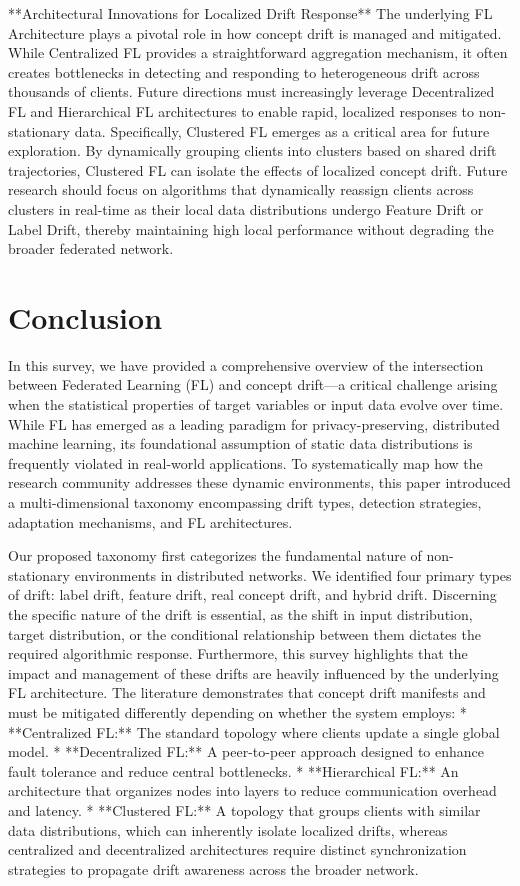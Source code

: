 \documentclass[journal]{IEEEtran}
\begin{document}
**Architectural Innovations for Localized Drift Response**
The underlying FL Architecture plays a pivotal role in how concept drift is managed and mitigated. While Centralized FL provides a straightforward aggregation mechanism, it often creates bottlenecks in detecting and responding to heterogeneous drift across thousands of clients. Future directions must increasingly leverage Decentralized FL and Hierarchical FL architectures to enable rapid, localized responses to non-stationary data. Specifically, Clustered FL emerges as a critical area for future exploration. By dynamically grouping clients into clusters based on shared drift trajectories, Clustered FL can isolate the effects of localized concept drift. Future research should focus on algorithms that dynamically reassign clients across clusters in real-time as their local data distributions undergo Feature Drift or Label Drift, thereby maintaining high local performance without degrading the broader federated network.

\section{Conclusion}
\label{sec:conclusion}

In this survey, we have provided a comprehensive overview of the intersection between Federated Learning (FL) and concept drift—a critical challenge arising when the statistical properties of target variables or input data evolve over time. While FL has emerged as a leading paradigm for privacy-preserving, distributed machine learning, its foundational assumption of static data distributions is frequently violated in real-world applications. To systematically map how the research community addresses these dynamic environments, this paper introduced a multi-dimensional taxonomy encompassing drift types, detection strategies, adaptation mechanisms, and FL architectures.

Our proposed taxonomy first categorizes the fundamental nature of non-stationary environments in distributed networks. We identified four primary types of drift: label drift, feature drift, real concept drift, and hybrid drift. Discerning the specific nature of the drift is essential, as the shift in input distribution, target distribution, or the conditional relationship between them dictates the required algorithmic response. Furthermore, this survey highlights that the impact and management of these drifts are heavily influenced by the underlying FL architecture. The literature demonstrates that concept drift manifests and must be mitigated differently depending on whether the system employs:
*   **Centralized FL:** The standard topology where clients update a single global model.
*   **Decentralized FL:** A peer-to-peer approach designed to enhance fault tolerance and reduce central bottlenecks.
*   **Hierarchical FL:** An architecture that organizes nodes into layers to reduce communication overhead and latency.
*   **Clustered FL:** A topology that groups clients with similar data distributions, which can inherently isolate localized drifts, whereas centralized and decentralized architectures require distinct synchronization strategies to propagate drift awareness across the broader network.
\end{document}
